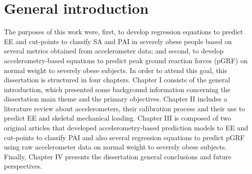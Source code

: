 \documentclass[12pt]{article}
\begin{document}
\section*{General introduction}

The purposes of this work were, first, to develop regression equations to predict EE and cut-points to classify SA and PAI in severely obese people based on several metrics obtained from accelerometer data; and second, to develop accelerometry-based equations to predict peak ground reaction forces (pGRF) on normal weight to severely obese subjects. In order to attend this goal, this dissertation is structured in four chapters. Chapter I consists of the general introduction, which presented some background information concerning the dissertation main theme and the primary objectives. Chapter II includes a literature review about accelerometers, their calibration process and their use to predict EE and skeletal mechanical loading. Chapter III is composed of two original articles that developed accelerometry-based prediction models to EE and cut-points to classify PAI and also several regression equations to predict pGRF using raw accelerometer data on normal weight to severely obese subjects. Finally, Chapter IV presents the  dissertation general conclusions and future perspectives.


%
%
\end{document}
